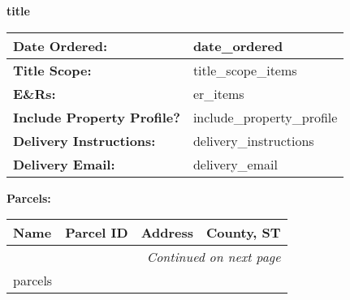 \documentclass[12pt]{article}
\begin{document}

\setlength{\parindent}{0pt}
\setlength{\tabcolsep}{8pt}

\begin{center}
\Large\textbf{{{title}}}
\end{center}

\vspace{1em}
\noindent
{\setlength{\baselineskip}{0em}%
 \setlength{\parskip}{0pt}%
\begin{tabular}{>{\raggedleft\arraybackslash}m{1.8in}|m{5.5in}}
    \textbf{Date Ordered:} & {{date_ordered}} \\ \hline
    \textbf{Title Scope:} & {{title_scope_items}} \\ \hline
    \textbf{E\&Rs:} & {{er_items}} \\ \hline
    \textbf{Include Property Profile?} & {{include_property_profile}} \\ \hline
    \textbf{Delivery Instructions:} & {{delivery_instructions}} \\ \hline
    \textbf{Delivery Email:} & {{delivery_email}} \\ \hline
\end{tabular}}

\vspace{1em}
\noindent\textbf{Parcels:}
\vspace{0.5em}

\noindent
\setlength{\arrayrulewidth}{0.5pt}
\begin{center}
\begin{tabularx}{\textwidth}{|l|l|X|l|}
    \hline
    \rowcolor{white}\textbf{Name} & \textbf{Parcel ID} & \textbf{Address} & \textbf{County, ST} \\
    \hline
    \endhead
    
    \hline
    \multicolumn{4}{|r|}{\normalsize\textit{Continued on next page}} \\
    \hline
    \endfoot
    
    \hline
    \endlastfoot
    
    {{parcels}}
\end{tabularx}
\end{center}
\end{document}
